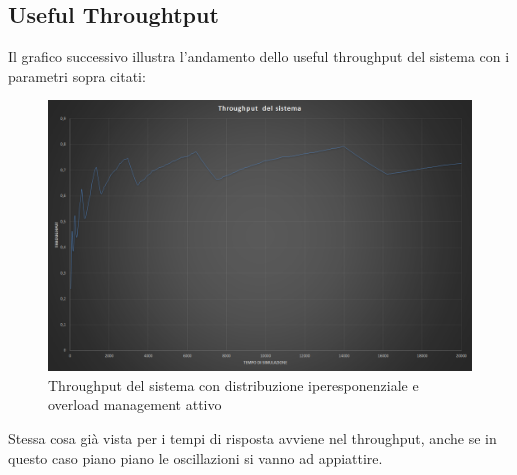\subsection{Useful Throughtput}
Il grafico successivo illustra l’andamento dello useful throughput del sistema con i 
parametri sopra citati:
\begin{figure}[H]
 \centering
 \includegraphics[scale=0.45]{img/throughputOM.png}
 \caption[Throughput del sistema con distribuzione iperesponenziale e overload management attivo]{Throughput del sistema con distribuzione iperesponenziale e overload management attivo}
 \label{fig:Throughput del sistema con distribuzione iperesponenziale e overload management attivo}
\end{figure}
Stessa cosa gi\`a vista per i tempi di risposta avviene nel throughput, anche se in questo caso piano
piano le oscillazioni si vanno ad appiattire.


